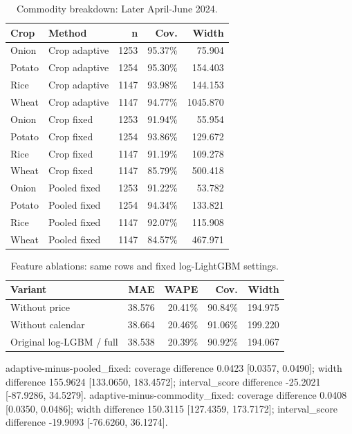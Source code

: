 \documentclass[conference]{IEEEtran}
\begin{document}
\begin{table}[!ht]\centering\scriptsize\caption{Commodity breakdown: Later April-June 2024.}\begin{tabular}{llrrr}
\toprule
Crop & Method & n & Cov. & Width \\
\midrule
Onion & Crop adaptive & 1253 & 95.37\% & 75.904 \\
Potato & Crop adaptive & 1254 & 95.30\% & 154.403 \\
Rice & Crop adaptive & 1147 & 93.98\% & 144.153 \\
Wheat & Crop adaptive & 1147 & 94.77\% & 1045.870 \\
Onion & Crop fixed & 1253 & 91.94\% & 55.954 \\
Potato & Crop fixed & 1254 & 93.86\% & 129.672 \\
Rice & Crop fixed & 1147 & 91.19\% & 109.278 \\
Wheat & Crop fixed & 1147 & 85.79\% & 500.418 \\
Onion & Pooled fixed & 1253 & 91.22\% & 53.782 \\
Potato & Pooled fixed & 1254 & 94.34\% & 133.821 \\
Rice & Pooled fixed & 1147 & 92.07\% & 115.908 \\
Wheat & Pooled fixed & 1147 & 84.57\% & 467.971 \\
\bottomrule
\end{tabular}
\end{table}
\begin{table}[!ht]\centering\small\caption{Feature ablations: same rows and fixed log-LightGBM settings.}\begin{tabular}{lrrrr}
\toprule
Variant & MAE & WAPE & Cov. & Width \\
\midrule
Without price & 38.576 & 20.41\% & 90.84\% & 194.975 \\
Without calendar & 38.664 & 20.46\% & 91.06\% & 199.220 \\
Original log-LGBM / full & 38.538 & 20.39\% & 90.92\% & 194.067 \\
\bottomrule
\end{tabular}
\end{table}
adaptive-minus-pooled\_fixed: coverage difference 0.0423 [0.0357, 0.0490]; width difference 155.9624 [133.0650, 183.4572]; interval\_score difference -25.2021 [-87.9286, 34.5279].
adaptive-minus-commodity\_fixed: coverage difference 0.0408 [0.0350, 0.0486]; width difference 150.3115 [127.4359, 173.7172]; interval\_score difference -19.9093 [-76.6260, 36.1274].
\end{document}

